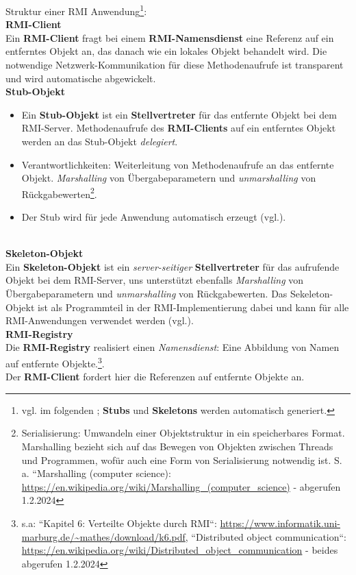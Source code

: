 \begin{tcolorbox}
    Struktur einer RMI Anwendung\footnote{vgl. im folgenden \cite[162 ff.]{HM05}; \textbf{Stubs} und \textbf{Skeletons} werden automatisch generiert.}:\\


    \noindent
    \textbf{RMI-Client}\\
    Ein \textbf{RMI-Client} fragt bei einem \textbf{RMI-Namensdienst} eine Referenz auf ein entferntes Objekt an, das danach wie ein lokales Objekt behandelt wird.
    Die notwendige Netzwerk-Kommunikation für diese Methodenaufrufe ist transparent und wird automatische abgewickelt.\\


    \noindent
    \textbf{Stub-Objekt}
    \begin{itemize}
        \item Ein \textbf{Stub-Objekt} ist ein \textbf{Stellvertreter} für das entfernte Objekt bei dem RMI-Server.
        Methodenaufrufe des \textbf{RMI-Clients} auf ein entferntes Objekt werden an das Stub-Objekt \textit{delegiert}.
        \item Verantwortlichkeiten: Weiterleitung von Methodenaufrufe an das entfernte Objekt. \textit{Marshalling} von Übergabeparametern und \textit{unmarshalling} von Rückgabewerten\footnote{
          Serialisierung: Umwandeln einer Objektstruktur in ein speicherbares Format. Marshalling bezieht sich auf das Bewegen von Objekten zwischen Threads und Programmen, wofür auch eine Form von Serialisierung notwendig ist. S. a. ``Marshalling (computer science): \url{https://en.wikipedia.org/wiki/Marshalling_(computer_science)} - abgerufen 1.2.2024
        }.
        \item Der Stub wird für jede Anwendung automatisch erzeugt (vgl.\cite[313]{Oec22}).
    \end{itemize}\\

    \noindent
    \textbf{Skeleton-Objekt}\\
   Ein \textbf{Skeleton-Objekt} ist ein \textit{server-seitiger} \textbf{Stellvertreter} für das aufrufende Objekt bei dem RMI-Server, uns unterstützt ebenfalls  \textit{Marshalling} von Übergabeparametern und \textit{unmarshalling} von Rückgabewerten. Das Sekeleton-Objekt ist als Programmteil in der RMI-Implementierung dabei und kann für alle RMI-Anwendungen verwendet werden (vgl.\cite[313]{Oec22}).\\

    \noindent
    \textbf{RMI-Registry}\\
    Die \textbf{RMI-Registry} realisiert einen \textit{Namensdienst}: Eine Abbildung von Namen auf entfernte Objekte.\footnote{
        s.a: ``Kapitel 6: Verteilte Objekte durch RMI``: \url{https://www.informatik.uni-marburg.de/~mathes/download/k6.pdf}, ``Distributed object communication``: \url{https://en.wikipedia.org/wiki/Distributed_object_communication} - beides abgerufen 1.2.2024
    }. \\
    Der \textbf{RMI-Client} fordert hier die Referenzen auf entfernte Objekte an.\\


\end{tcolorbox}
